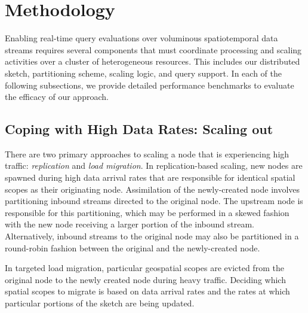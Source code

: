\section{Methodology}
\label{sec:methodology}
Enabling real-time query evaluations over voluminous spatiotemporal data streams requires several components that must coordinate processing and scaling activities over a cluster of heterogeneous resources. This includes our distributed sketch, partitioning scheme, scaling logic, and query support. In each of the following subsections, we provide detailed performance benchmarks to evaluate the efficacy of our approach.





\subsection{Coping with High Data Rates: Scaling out}
\label{subsec:scaling-out}
%
There are two primary approaches to scaling a node that is experiencing high traffic: \emph{replication} and \emph{load migration}. In replication-based scaling, new nodes are spawned during high data arrival rates that are responsible for identical spatial scopes as their originating node. Assimilation of the newly-created node involves partitioning inbound streams directed to the original node. The upstream node is responsible for this partitioning, which may be performed in a skewed fashion with the new node receiving a larger portion of the inbound stream.  Alternatively, inbound streams to the original node may also be partitioned in a round-robin fashion between the original and the newly-created node.

In targeted load migration, particular geospatial scopes are evicted from the original node to the newly created node during heavy traffic. Deciding which spatial scopes to migrate is based on data arrival rates and the rates at which particular portions of the sketch are being updated.

